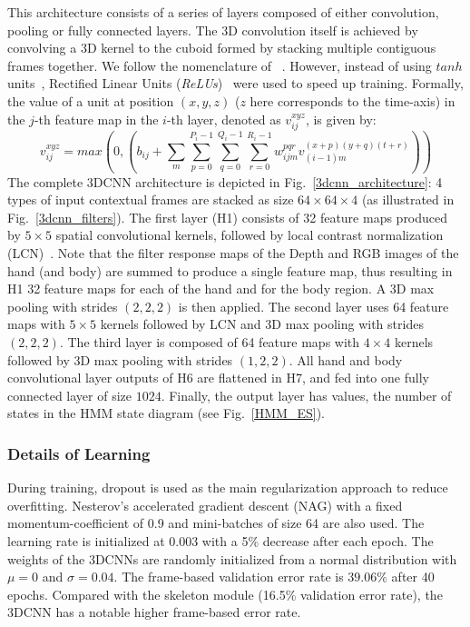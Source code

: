 This  architecture consists of a series of layers composed of either convolution, pooling or fully connected layers.
The 3D convolution itself is achieved by convolving a 3D kernel to the cuboid formed by stacking multiple contiguous frames together.
We follow the nomenclature of ~\cite{ji20133d}.
However, instead of using $tanh$ units~\cite{ji20133d},  Rectified Linear Units (\emph{ReLUs})~\cite{krizhevsky2012imagenet}
were used to speed up training.
Formally, the value of a unit at position $(x, y, z)$ ($z$ here corresponds to the time-axis) in the $j$-th feature map in the $i$-th layer, denoted as $v^{xyz}_{ij}$, is given by:
\begin{equation}
v^{xyz}_{ij} =  max( 0,  ( b_{ij} + \sum_m \sum_{p=0}^{P_i - 1} \sum_{q=0}^{Q_i -1 } \sum_{r=0}^{R_i -1} w^{pqr}_{ijm} v^{(x+p)(y+q)(t+r)}_{(i-1)m} ))
\label{ReLU}
\end{equation}
%
The complete 3DCNN architecture is depicted in Fig.~\ref{3dcnn_architecture}:
4 types of input contextual frames are stacked as size $64\times64\times4$ (as illustrated in Fig.~\ref{3dcnn_filters}).
%
The first layer (H1) consists of 32 feature maps produced by $5\times5$ spatial convolutional kernels,
followed by local contrast normalization (LCN)~\cite{jarrett2009best}.
%
Note that the filter response maps of the Depth and RGB images of the hand (and body) are summed to produce a single feature map,
thus resulting in H1 32 feature maps for each of the hand and for the body region.
%
A 3D max pooling with strides $(2,2,2)$ is then applied.
%
The second layer uses 64 feature maps with $5\times5$ kernels followed by LCN and 3D max pooling with strides $(2,2,2)$.
The third layer is composed of 64 feature maps with $4\times4$ kernels followed by 3D max pooling with strides $(1,2,2)$.
All hand and body convolutional layer outputs of H6 are flattened in H7, and fed into one fully connected layer of size $1024$.
%
Finally, the output layer has \numberhiddenstate values, the number of states in the HMM state diagram (see Fig.~\ref{HMM_ES}).




\subsubsection{Details of Learning}
During training, dropout \cite{hinton2012improving} is used as the main regularization approach to reduce overfitting.
Nesterov's accelerated gradient descent (NAG) \cite{sutskever2013importance} with a fixed momentum-coefficient of 0.9 and mini-batches of size 64 are also used.
The learning rate is initialized at 0.003 with a 5\% decrease after each epoch. The weights of the 3DCNNs are randomly initialized from a normal distribution with $\mu = 0$ and $\sigma = 0.04$.
The frame-based validation error rate is $39.06\%$ after 40 epochs. %
Compared with the skeleton module (16.5\% validation error rate), the 3DCNN has a notable higher frame-based error rate.


